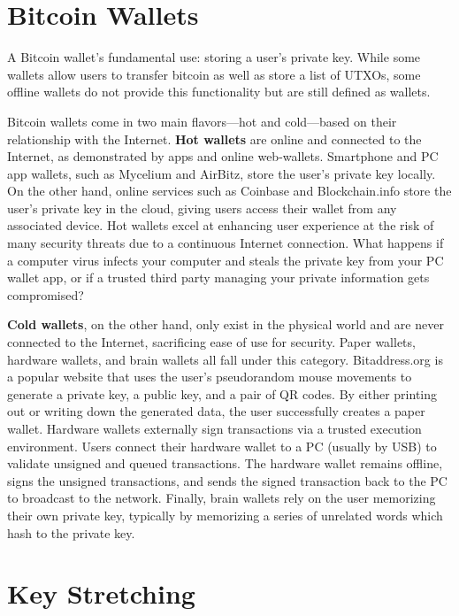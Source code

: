 \documentclass[full.tex]{subfiles}
\begin{document}
    \section*{Bitcoin Wallets}
    
    A Bitcoin wallet's fundamental use: storing a user's private key. While some wallets allow users to transfer bitcoin as well as store a list of UTXOs, some offline wallets do not provide this functionality but are still defined as wallets. 
    
    Bitcoin wallets come in two main flavors---hot and cold---based on their relationship with the Internet. \textbf{Hot wallets} are online and connected to the Internet, as demonstrated by apps and online web-wallets. Smartphone and PC app wallets, such as Mycelium and AirBitz, store the user's private key locally. On the other hand, online services such as Coinbase and Blockchain.info store the user's private key in the cloud, giving users access their wallet from any associated device. Hot wallets excel at enhancing user experience at the risk of many security threats due to a continuous Internet connection. What happens if a computer virus infects your computer and steals the private key from your PC wallet app, or if a trusted third party managing your private information gets compromised?
    
    \textbf{Cold wallets}, on the other hand, only exist in the physical world and are never connected to the Internet, sacrificing ease of use for security. Paper wallets, hardware wallets, and brain wallets all fall under this category. Bitaddress.org is a popular website that uses the user's pseudorandom mouse movements to generate a private key, a public key, and a pair of QR codes. By either printing out or writing down the generated data, the user successfully creates a paper wallet. Hardware wallets externally sign transactions via a trusted execution environment. Users connect their hardware wallet to a PC (usually by USB) to validate unsigned and queued transactions. The hardware wallet remains offline, signs the unsigned transactions, and sends the signed transaction back to the PC to broadcast to the network. Finally, brain wallets rely on the user memorizing their own private key, typically by memorizing a series of unrelated words which hash to the private key. 
    
    \section*{Key Stretching}
    
\end{document}
